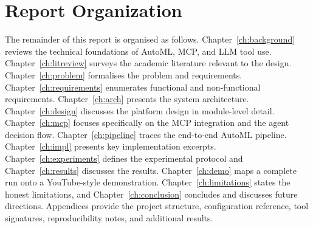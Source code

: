 \section{Report Organization}
\label{sec:report-org}

The remainder of this report is organised as follows.
Chapter~\ref{ch:background} reviews the technical foundations of
AutoML, MCP, and LLM tool use.
Chapter~\ref{ch:litreview} surveys the academic literature relevant to
the design.
Chapter~\ref{ch:problem} formalises the problem and requirements.
Chapter~\ref{ch:requirements} enumerates functional and non-functional
requirements.
Chapter~\ref{ch:arch} presents the system architecture.
Chapter~\ref{ch:design} discusses the platform design in module-level
detail.
Chapter~\ref{ch:mcp} focuses specifically on the MCP integration and
the agent decision flow.
Chapter~\ref{ch:pipeline} traces the end-to-end AutoML pipeline.
Chapter~\ref{ch:impl} presents key implementation excerpts.
Chapter~\ref{ch:experiments} defines the experimental protocol and
Chapter~\ref{ch:results} discusses the results.
Chapter~\ref{ch:demo} maps a complete run onto a YouTube-style
demonstration.
Chapter~\ref{ch:limitations} states the honest limitations, and
Chapter~\ref{ch:conclusion} concludes and discusses future directions.
Appendices provide the project structure, configuration reference,
tool signatures, reproducibility notes, and additional results.
